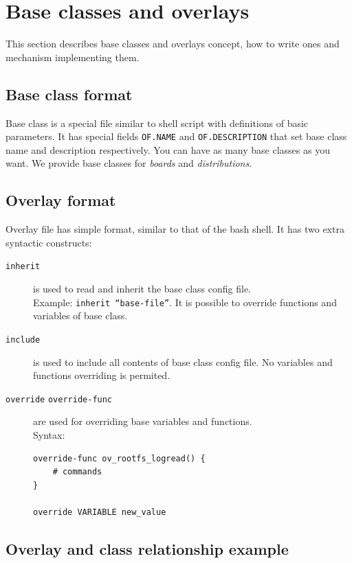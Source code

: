 \section{Base classes and overlays }
\label{sec:overlays}
This section describes base classes and overlays concept, how to write ones and mechanism implementing them.

\subsection{Base class format}

\label{subsec:jtaclass_fmt}
Base class is a special file similar to shell script with definitions of basic parameters.
It has special fields \texttt{OF.NAME} and \texttt{OF.DESCRIPTION} that set base class name and description respectively.
You can have as many base classes as you want. We provide base classes for \emph{boards} and \emph{distributions}.

\subsection{Overlay format}
\label{subsec:overlay_fmt}
Overlay file has simple format, similar to that of the bash shell.
It has two extra syntactic constructs:
\begin{description}
\item[\texttt{inherit}] is used to read and inherit the base class config file.  \\Example:  \texttt{inherit ``base-file''}. It is possible to override functions and variables of base class.
\item[\texttt{include}] is used to include all contents of base class config file. No variables and functions overriding is permited.
\item[\texttt{override} \texttt{override-func}] are used for overriding base variables and functions.\\Syntax:
\begin{verbatim}
override-func ov_rootfs_logread() {
    # commands
}

override VARIABLE new_value
\end{verbatim}
\end{description}

\subsection{Overlay and class relationship example}
\label{sec:ov_class_example}

